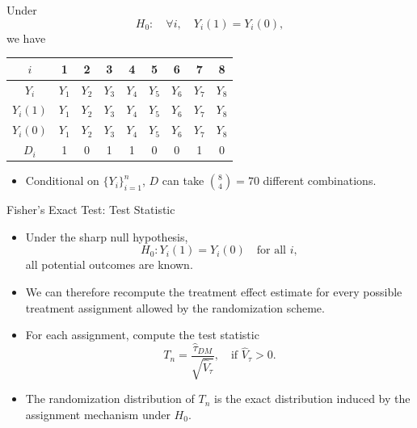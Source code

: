 \documentclass[11pt,aspectratio=169]{beamer}
\begin{document}
\begin{frame}
Under
$$H_0 : \quad \forall i, \quad Y_i(1) = Y_i(0),$$
we have
\pause
\begin{center}
\begin{tabular}{ccccccccc}
\hline
$i$ & 1 & 2 & 3 & 4 & 5 & 6 & 7 & 8 \\
\hline
$Y_i$ & $Y_1$ & $Y_2$ & $Y_3$ & $Y_4$ & $Y_5$ & $Y_6$ & $Y_7$ & $Y_8$ \\
$Y_i(1)$ & $Y_1$ & $Y_2$ & $Y_3$ & $Y_4$ & $Y_5$ & $Y_6$ & $Y_7$ & $Y_8$ \\
$Y_i(0)$ & $Y_1$ & $Y_2$ & $Y_3$ & $Y_4$ & $Y_5$ & $Y_6$ & $Y_7$ & $Y_8$ \\
$D_i$ & 1 & 0 & 1 & 1 & 0 & 0 & 1 & 0 \\
\hline
\end{tabular}
\end{center}

\begin{itemize}
    \item Conditional on $\{Y_i\}_{i=1}^n$, $D$ can take $\binom{8}{4} = 70$ different combinations.
\end{itemize}
\end{frame}

\begin{frame}{Fisher's Exact Test: Test Statistic}

\begin{itemize}
    \item Under the sharp null hypothesis,
    $$H_0 : Y_i(1) = Y_i(0) \quad \text{for all } i,$$
    all potential outcomes are known.
    \item We can therefore recompute the treatment effect estimate for every possible treatment assignment allowed by the randomization scheme.
    \item For each assignment, compute the test statistic
    $$T_n = \frac{\widehat{\tau}_{DM}}{\sqrt{\widehat{V}_{\tau}}}, \quad \text{if } \widehat{V}_{\tau} > 0.$$
    \item The randomization distribution of $T_n$ is the exact distribution induced by the assignment mechanism under $H_0$.
\end{itemize}

\end{frame}
\end{document}
